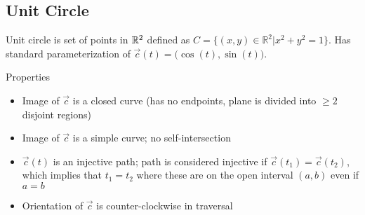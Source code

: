 \subsection{Unit Circle}

Unit circle is set of points in $\mathbb{R}^2$ defined as $C=\{(x,y)\in\mathbb{R} ^2|x^2+y^2=1\}$.
Has standard parameterization of $\vec{c}(t)=\big(\cos(t),\sin(t)\big)$.\newline 

\noindent Properties
\begin{itemize}
    \item Image of $\vec{c}$ is a closed curve (has no endpoints, plane is divided into $\geq 2$ disjoint regions)
    \item Image of $\vec{c}$ is a simple curve; no self-intersection 
    \item $\vec{c}(t)$ is an injective path; path is considered injective if $\vec{c}(t_1)=\vec{c}(t_2)$, which implies that $t_1=t_2$ where 
    these are on the open interval $(a,b)$ even if $a=b$
    \item Orientation of $\vec{c}$ is counter-clockwise in traversal
\end{itemize}

